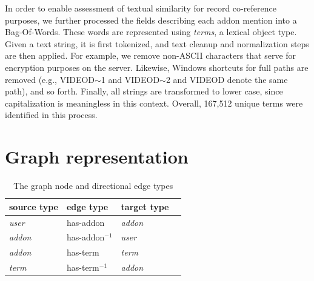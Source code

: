 \documentclass[11pt,oneside]{book}
\let\Oldsection\section
\renewcommand{\section}{\FloatBarrier\Oldsection}
\begin{document}
In order to enable assessment of textual similarity for record co-reference purposes, we further processed the fields describing each addon mention into a Bag-Of-Words. These words are represented using {\it terms}, a lexical object type. Given a text string, it is first tokenized, and text cleanup and normalization steps are then applied. For example, we remove non-ASCII characters that serve for encryption purposes on the server. Likewise,  Windows shortcuts for full paths are removed (e.g., VIDEOD$\sim$1 and VIDEOD$\sim$2 and VIDEOD denote the same path), and so forth. Finally, all strings are transformed to lower case, since capitalization is meaningless in this context. Overall, 167,512 unique terms were identified in this process.


\section{Graph representation}
\label{sec:graph_representation}
\begin{table}[t]
\begin{center}
\begin{small}
\begin{tabular}{llll}
\hline 
\textbf{source type} & \textbf{edge type} & \textbf{target type} \\
\hline
{\it user} & has-addon & {\it addon} \\
\hline
{\it addon} &  has-addon$^{-1}$ & {\it user} \\
{\it addon} & has-term & {\it term} \\
\hline
{\it term} & has-term$^{-1}$ & {\it addon} \\
\hline
\end{tabular}
\end{small}
\end{center}
\caption{\label{tab:graph_structure} The graph node and directional edge types}
\end{table}
\end{document}
